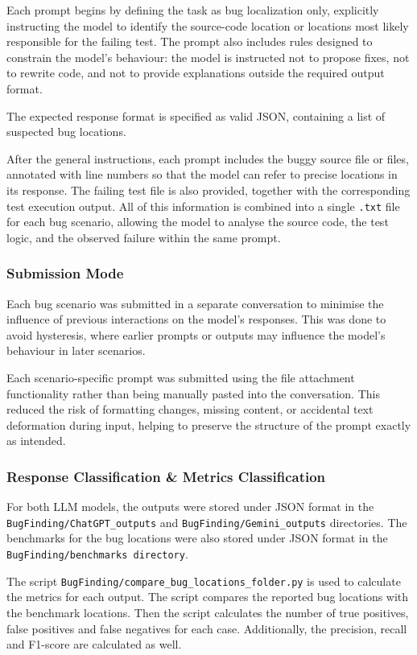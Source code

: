 \documentclass[11pt,a4paper]{article}
\begin{document}
    Each prompt begins by defining the task as bug localization only, explicitly instructing the model to identify the source-code location or locations most likely responsible for the failing test. The prompt also includes rules designed to constrain the model’s behaviour: the model is instructed not to propose fixes, not to rewrite code, and not to provide explanations outside the required output format.

    The expected response format is specified as valid JSON, containing a list of suspected bug locations. 

    After the general instructions, each prompt includes the buggy source file or files, annotated with line numbers so that the model can refer to precise locations in its response. The failing test file is also provided, together with the corresponding test execution output. All of this information is combined into a single \texttt{.txt} file for each bug scenario, allowing the model to analyse the source code, the test logic, and the observed failure within the same prompt.
    
    
    \subsubsection{Submission Mode}
    Each bug scenario was submitted in a separate conversation to minimise the influence of previous interactions on the model’s responses. This was done to avoid hysteresis, where earlier prompts or outputs may influence the model’s behaviour in later scenarios.

    Each scenario-specific prompt was submitted using the file attachment functionality rather than being manually pasted into the conversation. This reduced the risk of formatting changes, missing content, or accidental text deformation during input, helping to preserve the structure of the prompt exactly as intended.
    
     \subsubsection{Response Classification \& Metrics Classification}
     For both LLM models, the outputs were stored under JSON format in the \texttt{BugFinding/ChatGPT\_outputs} and \texttt{BugFinding/Gemini\_outputs} directories. The benchmarks for the bug locations were also stored under JSON format in the \texttt{BugFinding/benchmarks directory}. 

     The script \texttt{BugFinding/compare\_bug\_locations\_folder.py} is used to calculate the metrics for each output. The script compares the reported bug locations with the benchmark locations. Then the script calculates the number of true positives, false positives and false negatives for each case. Additionally, the precision, recall and F1-score are calculated as well.
\end{document}
